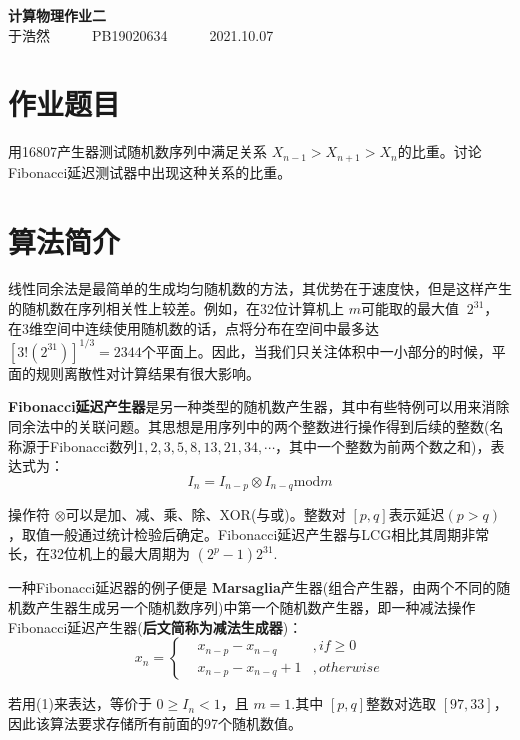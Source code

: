 \documentclass[qpt,a4paper,utf8]{ctexart}
\begin{document}
\begin{center}
    {\LARGE\textbf{计算物理作业二}}\\
    \textrm{于浩然}~~~~~~\textrm{PB19020634}~~~~~~\textrm{2021.10.07}
\end{center}
\section{作业题目}
用16807产生器测试随机数序列中满足关系
$X_{n-1}>X_{n+1}>X_n$的比重。讨论Fibonacci延迟测试器中出现这种关系的比重。
\section{算法简介}

线性同余法是最简单的生成均匀随机数的方法，其优势在于速度快，但是这样产生的随机数在序列相关性上较差。例如，在32位计算机上
$m$可能取的最大值 $~2^{31}$，在3维空间中连续使用随机数的话，点将分布在空间中最多达
$[3!(2^{31})]^{1/3}=2344$个平面上。因此，当我们只关注体积中一小部分的时候，平面的规则离散性对计算结果有很大影响。

\textbf{Fibonacci延迟产生器}是另一种类型的随机数产生器，其中有些特例可以用来消除同余法中的关联问题。其思想是用序列中的两个整数进行操作得到后续的整数(名称源于Fibonacci数列$1,2,3,5,8,13,21,34, \cdots$，其中一个整数为前两个数之和)，表达式为：
\begin{equation}
    I_n=I_{n-p} \otimes I_{n-q} \mathrm{mod} m
\end{equation}

操作符 $\otimes$可以是加、减、乘、除、XOR(与或)。整数对
$[p,q]$表示延迟$(p>q)$，取值一般通过统计检验后确定。Fibonacci延迟产生器与LCG相比其周期非常长，在32位机上的最大周期为
$(2^p-1)2^{31}$.

一种Fibonacci延迟器的例子便是
\textbf{Marsaglia}产生器(组合产生器，由两个不同的随机数产生器生成另一个随机数序列)中第一个随机数产生器，即一种减法操作Fibonacci延迟产生器(\textbf{后文简称为减法生成器})：
\begin{equation}
    x_n=\left\{
        \begin{aligned}
        & x_{n-p}-x_{n-q} \quad & ,if \geq 0 \\   
        & x_{n-p}-x_{n-q}+1 & ,otherwise
        \end{aligned}
        \right.
\end{equation}

若用(1)来表达，等价于 $0 \geq I_n < 1$，且 $m=1$.其中 $[p,q]$整数对选取
$[97,33]$，因此该算法要求存储所有前面的97个随机数值。
\end{document}
